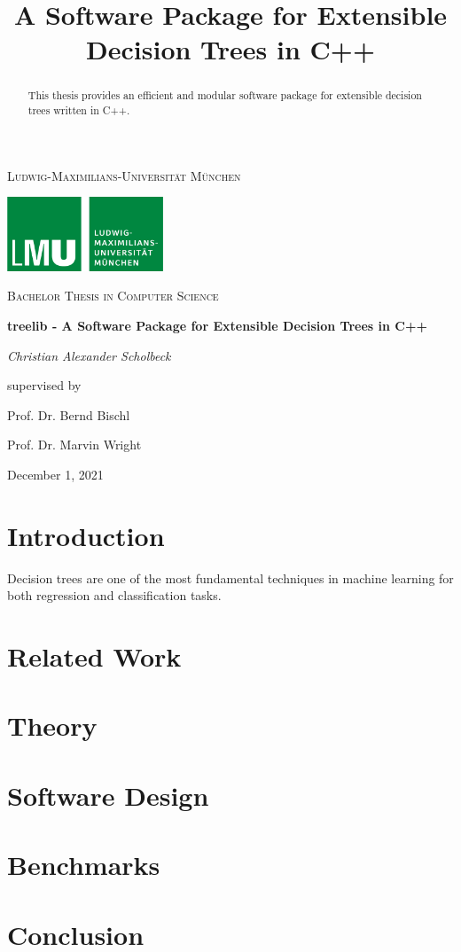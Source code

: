 \documentclass[a4paper, 11pt]{article}
\begin{document}
\title{A Software Package for Extensible Decision Trees in C++}

\begin{titlepage}
	\centering
	\vspace{1cm}
	{\scshape\LARGE Ludwig-Maximilians-Universität München \par}
	\vspace{1cm}
	\includegraphics[width=0.35\textwidth]{figure/lmu_logo.png}\par\vspace{1cm}
	\vspace{0.5cm}
	{\scshape\Large Bachelor Thesis in Computer Science\par}
	\vspace{1.5cm}
	{\huge\bfseries treelib - A Software Package for Extensible Decision Trees in C++\par}
	\vspace{2cm}
	{\Large\itshape Christian Alexander Scholbeck\par}
	\vfill
	supervised by\par
	Prof. Dr. Bernd Bischl \par
	Prof. Dr. Marvin Wright

	\vfill

	{\large December 1, 2021 \par}
\end{titlepage}

\newpage
\thispagestyle{empty}
\vspace*{\fill}
\begin{abstract}
This thesis provides an efficient and modular software package for extensible decision trees written in C++.  

\end{abstract}
\vspace*{\fill}
\clearpage
\setcounter{page}{1}
\section{Introduction}

Decision trees are one of the most fundamental techniques in machine learning for both regression and classification tasks.


\section{Related Work}

\section{Theory}

\section{Software Design}

\section{Benchmarks}

\section{Conclusion}
\end{document}
